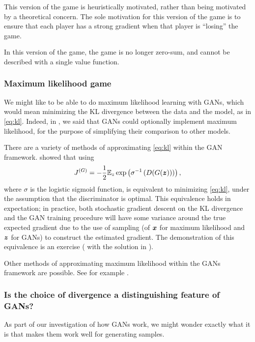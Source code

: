 This version of the game is heuristically motivated, rather than being motivated by a theoretical
concern.
The sole motivation for this version of the game is to ensure that each player has a strong
gradient when that player is ``losing'' the game.

In this version of the game, the game is no longer zero-sum, and cannot be described with a single
value function.

\subsubsection{Maximum likelihood game}
\label{sec:mle_gan}

We might like to be able to do maximum likelihood learning with GANs, which would mean minimizing
the KL divergence between the data and the model, as in \eqref{eq:kl}.
Indeed, in , we said that GANs could optionally implement maximum likelihood,
for the purpose of simplifying their comparison to other models.

There are a variety of methods of approximating \eqref{eq:kl} within the GAN
framework.
\citet{Goodfellow-ICLR2015} showed that using
\[ J^{(G)} = -\frac{1}{2} \mathbb{E}_z \exp\left( \sigma^{-1} \left( D(G({\bm{z}})) \right) \right), \]
  where $\sigma$ is the logistic sigmoid function, is equivalent to minimizing \eqref{eq:kl},
  under the assumption that the discriminator is optimal.
  This equivalence holds in expectation; in practice, both stochastic gradient descent on the KL
  divergence and the GAN training procedure will have some variance around the true expected
  gradient due to the use of sampling (of ${\bm{x}}$ for maximum likelihood and ${\bm{z}}$ for GANs)
  to construct the estimated gradient.
  The demonstration of this equivalence is an exercise (
  with the solution in ).


  Other methods of approximating maximum likelihood within the GANs framework are possible.
  See for example \citet{nowozin2016f}.
  
 

  \subsubsection{Is the choice of divergence a distinguishing feature of GANs?}

  As part of our investigation of how GANs work, we might wonder exactly what it is
  that makes them work well for generating samples.

